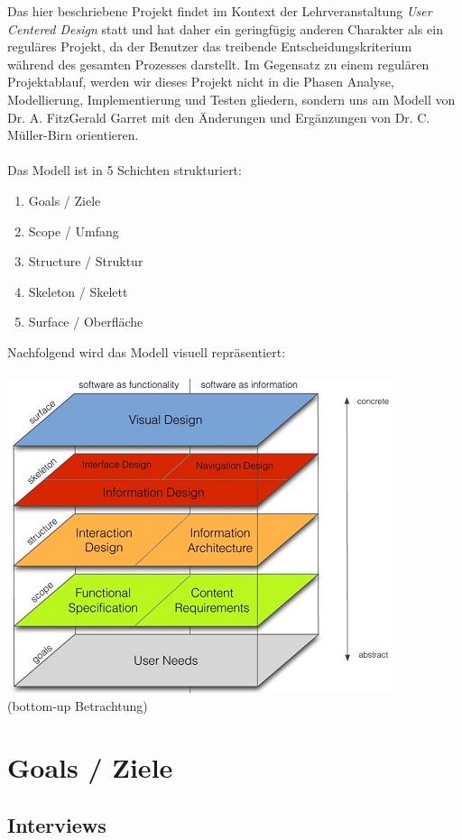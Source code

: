 \documentclass{article}
\begin{document}
Das hier beschriebene Projekt findet im Kontext der Lehrveranstaltung \textit{User Centered Design} statt und hat daher ein geringfügig anderen Charakter als ein reguläres Projekt, da der Benutzer das treibende Entscheidungskriterium während des gesamten Prozesses darstellt. Im Gegensatz zu einem regulären Projektablauf, werden wir dieses Projekt nicht in die Phasen Analyse, Modellierung, Implementierung und Testen gliedern, sondern uns am Modell von Dr. A. FitzGerald Garret mit den Änderungen und Ergänzungen von Dr. C. Müller-Birn orientieren.\\
\\
Das Modell ist in 5 Schichten strukturiert:
\begin{enumerate}
\item Goals / Ziele
\item Scope / Umfang
\item Structure / Struktur
\item Skeleton / Skelett
\item Surface / Oberfläche
\end{enumerate}
Nachfolgend wird das Modell visuell repräsentiert:\\
\\
\includegraphics{schichten.jpg}\\
(bottom-up Betrachtung)
\newpage

\section{Goals / Ziele}

\subsection{Interviews}
\end{document}
